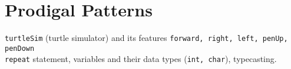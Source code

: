 \documentclass[../../Problems]{subfiles}
\begin{document}
\section{Prodigal Patterns}{\label{sec:prodigalpatterns}}
\begin{topics}
\verb!turtleSim! (turtle simulator) and its features \verb!forward, right, left, penUp, penDown!\\
\verb!repeat! statement, variables and their data types (\verb!int, char!), typecasting.
\end{topics}






\end{document}
